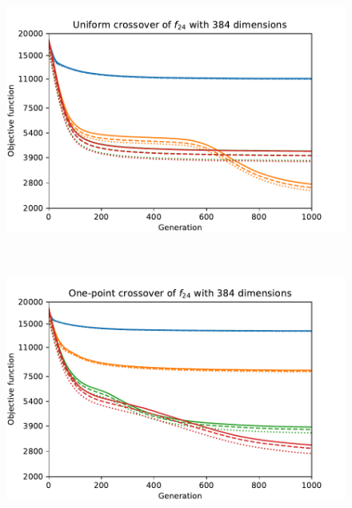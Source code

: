 \begin{figure}[ht!]
\begin{minipage}[t]{0.32\textwidth}
    \end{minipage}
    \hfill
    \begin{minipage}[t]{0.32\textwidth}
        \centering
        \includegraphics[width=\textwidth]{img/runs/fitness_es_crossover_f24_dim384_Uniform.pdf}
    \end{minipage}
    \\
    \centering
    \begin{minipage}[t]{0.32\textwidth}
        \includegraphics[width=\textwidth]{img/runs/fitness_es_crossover_f24_dim384_OnePoint1D.pdf}
    \end{minipage}
    \begin{minipage}[t]{0.32\textwidth}
        \centering

\end{minipage}
\end{figure}
